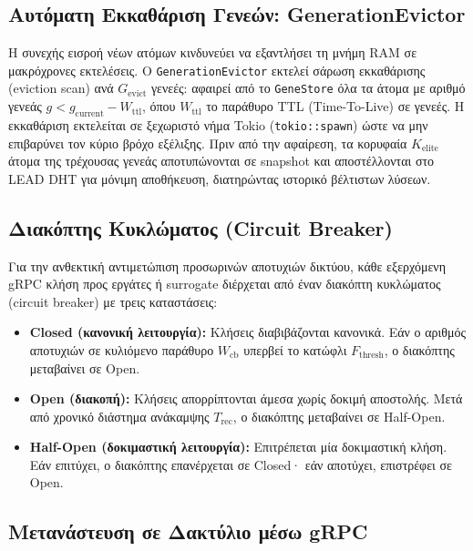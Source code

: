 \subsection{Αυτόματη Εκκαθάριση Γενεών: GenerationEvictor}
\label{subsec:impl_evictor}

Η συνεχής εισροή νέων ατόμων κινδυνεύει να εξαντλήσει τη μνήμη RAM σε μακρόχρονες εκτελέσεις. Ο \texttt{GenerationEvictor} εκτελεί σάρωση εκκαθάρισης (eviction scan) ανά $G_{\text{evict}}$ γενεές: αφαιρεί από το \texttt{GeneStore} όλα τα άτομα με αριθμό γενεάς $g < g_{\text{current}} - W_{\text{ttl}}$, όπου $W_{\text{ttl}}$ το παράθυρο TTL (Time-To-Live) σε γενεές. Η εκκαθάριση εκτελείται σε ξεχωριστό νήμα Tokio (\texttt{tokio::spawn}) ώστε να μην επιβαρύνει τον κύριο βρόχο εξέλιξης. Πριν από την αφαίρεση, τα κορυφαία $K_{\text{elite}}$ άτομα της τρέχουσας γενεάς αποτυπώνονται σε snapshot και αποστέλλονται στο LEAD DHT για μόνιμη αποθήκευση, διατηρώντας ιστορικό βέλτιστων λύσεων.

\subsection{Διακόπτης Κυκλώματος (Circuit Breaker)}
\label{subsec:impl_circuit_breaker}

Για την ανθεκτική αντιμετώπιση προσωρινών αποτυχιών δικτύου, κάθε εξερχόμενη gRPC κλήση προς εργάτες ή surrogate διέρχεται από έναν διακόπτη κυκλώματος (circuit breaker) με τρεις καταστάσεις:
\begin{itemize}
    \item \textbf{Closed (κανονική λειτουργία):} Κλήσεις διαβιβάζονται κανονικά. Εάν ο αριθμός αποτυχιών σε κυλιόμενο παράθυρο $W_{\text{cb}}$ υπερβεί το κατώφλι $F_{\text{thresh}}$, ο διακόπτης μεταβαίνει σε Open.
    \item \textbf{Open (διακοπή):} Κλήσεις απορρίπτονται άμεσα χωρίς δοκιμή αποστολής. Μετά από χρονικό διάστημα ανάκαμψης $T_{\text{rec}}$, ο διακόπτης μεταβαίνει σε Half-Open.
    \item \textbf{Half-Open (δοκιμαστική λειτουργία):} Επιτρέπεται μία δοκιμαστική κλήση. Εάν επιτύχει, ο διακόπτης επανέρχεται σε Closed· εάν αποτύχει, επιστρέφει σε Open.
\end{itemize}

\subsection{Μετανάστευση σε Δακτύλιο μέσω gRPC}
\label{subsec:impl_migration}


